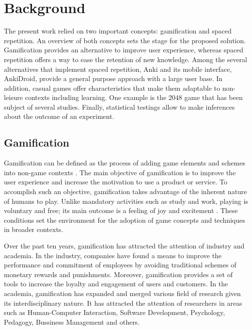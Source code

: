 
\chapter{Background} %

\label{back} %

The present work relied on two important concepts: gamification and spaced repetition. An overview of both concepts sets the stage for the proposed solution. Gamification provides an alternative to improve user experience, whereas spaced repetition offers a way to ease the retention of new knowledge. Among the several alternatives that implement spaced repetition, Anki and its mobile interface, AnkiDroid, provide a general purpose approach with a large user base. In addition, casual games offer characteristics that make them adaptable to non-leisure contexts including learning. One example is the 2048 game \citep{uberspot2017game} that has been subject of several studies. Finally, statistical testings allow to make inferences about the outcome of an experiment.

\section{Gamification}
Gamification can be defined as the process of adding game elements and schemes into non-game contexts \citep{deterding2011game}. The main objective of gamification is to improve the user experience and increase the motivation to use a product or service. To accomplish such an objective, gamification takes advantage of the inherent nature of humans to play. Unlike mandatory activities such as study and work, playing is voluntary and free; its main outcome is a feeling of joy and excitement \citep{johan1950homo}. These conditions set the environment for the adoption of game concepts and techniques in broader contexts.

Over the past ten years, gamification has attracted the attention of industry and academia. In the industry, companies have found a means to improve the performance and commitment of employees by avoiding traditional schemes of monetary rewards and punishments. Moreover, gamification provides a set of tools to increase the loyalty and engagement of users and customers. In the academia, gamification has expanded and merged various field of research given its interdisciplinary nature. It has attracted the attention of researchers in areas such as Human-Computer Interaction, Software Development, Psychology, Pedagogy, Bussiness Management and others.

